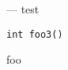 \startmanpage
{}
--- test 
\startvb\begin{verbatim}
int foo3()
\end{verbatim}
\endvb

foo
\endmanpage
